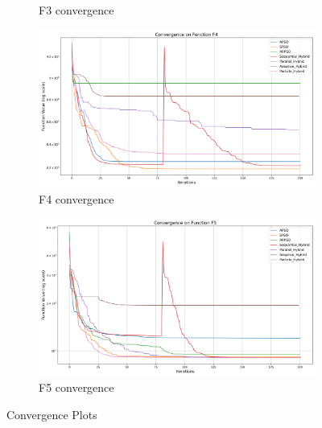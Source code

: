 \documentclass[aspectratio=169]{beamer}
\begin{document}
\begin{frame}
\begin{figure}
\begin{subfigure}[b]{0.19\textwidth}
            \caption*{F3 convergence}
        \end{subfigure}
        \hfill
        \begin{subfigure}[b]{0.19\textwidth}
            \includegraphics[width=\textwidth]{../plots/exploitation/hybrid_convergence_f4.png}
            \caption*{F4 convergence}
        \end{subfigure}
        \hfill
        \begin{subfigure}[b]{0.19\textwidth}
            \includegraphics[width=\textwidth]{../plots/exploitation/hybrid_convergence_f5.png}
            \caption*{F5 convergence}
        \end{subfigure}
        \vspace{-1ex}
        \caption*{\scriptsize Convergence Plots}
    \end{figure}
\end{frame}
\end{document}
